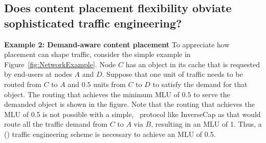

\subsection{Does content placement flexibility obviate sophisticated traffic engineering?}


\textbf{Example 2: Demand-aware content placement} To appreciate how placement can shape traffic, consider the simple example in Figure~\ref{fig:NetworkExample}. Node $C$ has an object in its cache that is requested by end-users at nodes $A$ and $D$. Suppose that one unit of traffic needs to be routed from $C$ to $A$ and $0.5$ units  from $C$ to $D$ to satisfy the demand for that object. The routing that achieves the minimum MLU of $0.5$ to serve the demanded object is shown in the figure. Note that the routing that achieves the MLU of 0.5 is not possible with a simple, \unplanned\ protocol like InverseCap as that would route all the traffic demand from $C$ to $A$ via $B$, resulting in an MLU of 1. Thus, a (\planned) traffic engineering scheme is necessary to achieve an MLU of 0.5.


